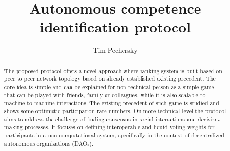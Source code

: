 \documentclass{article}
\title{Autonomous competence identification protocol}
\author{Tim Pechersky}
\begin{document}
\maketitle



\begin{abstract}
    The proposed protocol offers a novel approach where ranking system is built based on peer to peer network topology based on already established existing precedent.
    The core idea is simple and can be explained for non technical person as a simple game that can be played with friends, family or colleagues, while it is also scalable to machine to machine interactions.  The existing precedent of such game is studied and shows some optimistic participation rate numbers.
    On more technical level the protocol aims to address the challenge of finding consensus in social interactions and decision-making processes. It focuses on defining interoperable and liquid voting weights for participants in a non-computational system, specifically in the context of decentralized autonomous organizations (DAOs).
\end{abstract}
\end{document}
